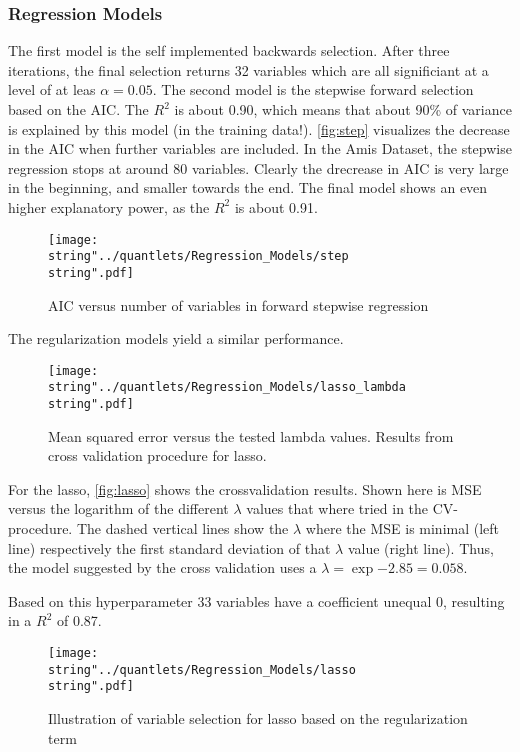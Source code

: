 
\subsubsection{Regression Models}
The first model is the self implemented backwards selection. After three iterations, the final selection returns 32 variables which are all significiant at a level of at leas $\alpha=0.05$. 
The second model is the stepwise forward selection based on the AIC. The $R^{2}$ is about 0.90, which means that about 90\% of variance is explained by this model (in the training data!).
\autoref{fig:step} visualizes the decrease in the AIC when further variables are included. In the Amis Dataset, the stepwise regression stops at around 80 variables. Clearly the drecrease in AIC is very large in the beginning, and smaller towards the end. 
The final model shows an even higher explanatory power, as the  $R^{2}$  is about 0.91. 

\begin{figure}[H]
  \centering
\texttt{[image: \\string"../quantlets/Regression\_Models/step\\string".pdf]}
  \caption{AIC versus number of variables in forward stepwise regression}\label{fig:step}
\end{figure}

The regularization models yield a similar performance. 
 
\begin{figure}[H]
  \centering
\texttt{[image: \\string"../quantlets/Regression\_Models/lasso\_lambda\\string".pdf]}
  \caption{Mean squared error versus the tested lambda values. Results from cross validation procedure for lasso.}\label{fig:lasso}
\end{figure}

For the lasso, \autoref{fig:lasso} shows the crossvalidation results. Shown here is  MSE versus the logarithm of the different $\lambda$ values that where tried in the CV-procedure. The dashed vertical lines show the $\lambda$ where the MSE is minimal (left line) respectively the first standard deviation of that $\lambda$ value (right line). Thus, the model suggested by the cross validation uses a $\lambda = \exp{-2.85}=0.058$. 

Based on this hyperparameter 33 variables have a coefficient unequal $0$, resulting in a $R^{2}$ of 0.87. 

\begin{figure}[H]
  \centering
\texttt{[image: \\string"../quantlets/Regression\_Models/lasso\\string".pdf]}
  \caption{Illustration of variable selection for lasso based on the regularization term}\label{fig:lasso1}
\end{figure}


